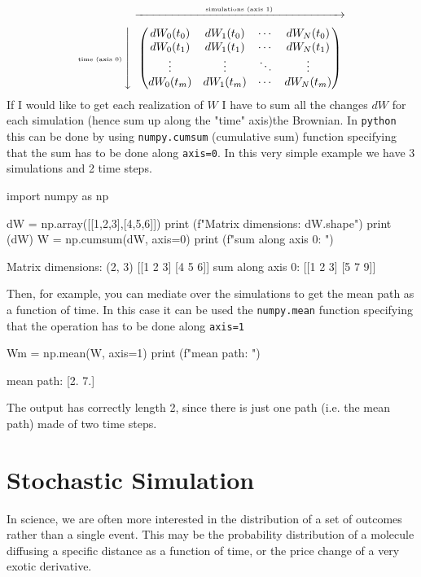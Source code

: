 \documentclass[12pt,a4paper]{article}
\newcommand{\mymatrix}[1]{\ensuremath{\left\downarrow\vphantom{#1}\right.\overset{\xrightarrow[\hphantom{#1}]{\text{simulations (axis 1)}}}{#1}}}
\begin{document}
\begin{equation}
	\text{\tiny time (axis 0)}\mymatrix{\begin{pmatrix}
			dW_0(t_0) & dW_1(t_0) & \cdots & dW_N(t_0) \\
			dW_0(t_1) & dW_1(t_1) & \cdots & dW_N(t_1) \\
			\vdots  & \vdots  & \ddots & \vdots  \\
			dW_0(t_m) & dW_1(t_m) & \cdots & dW_N(t_m)
	\end{pmatrix}}
\label{numpy_array}
\end{equation}
\vfill
If I would like to get each realization of $W$ I have to sum all the changes $dW$ for each simulation (hence sum up along the "time" axis)the Brownian. In \texttt{python} this can be done by using \texttt{numpy.cumsum} (cumulative sum) function specifying that the sum has to be done along \texttt{axis=0}. In this very simple example we have 3 simulations and 2 time steps.
\vfill

\begin{ipython}
import numpy as np

dW = np.array([[1,2,3],[4,5,6]])
print (f"Matrix dimensions: {dW.shape}")
print (dW)
W = np.cumsum(dW, axis=0)
print (f"sum along axis 0: ")
\end{ipython}
\begin{ioutput}
Matrix dimensions: (2, 3)
[[1 2 3]
[4 5 6]]
sum along axis 0: 
[[1 2 3]
[5 7 9]]
\end{ioutput}

Then, for example, you can mediate over the simulations to get the mean path as a function of time. In this case it can be used the \texttt{numpy.mean} function specifying that the operation has to be done along \texttt{axis=1}

\begin{ipython}
Wm = np.mean(W, axis=1)
print (f"mean path: ")
\end{ipython}
\begin{ioutput}
mean path: 
[2. 7.]
\end{ioutput}

The output has correctly length 2, since there is just one path (i.e. the mean path) made of two time steps.
\clearpage

\clearpage
\section{Stochastic Simulation}
In science, we are often more interested in the distribution of a set of outcomes rather than a single event. This may be the probability distribution of a molecule diffusing a specific distance as a function of time, or the price change of a very exotic derivative.
\end{document}

